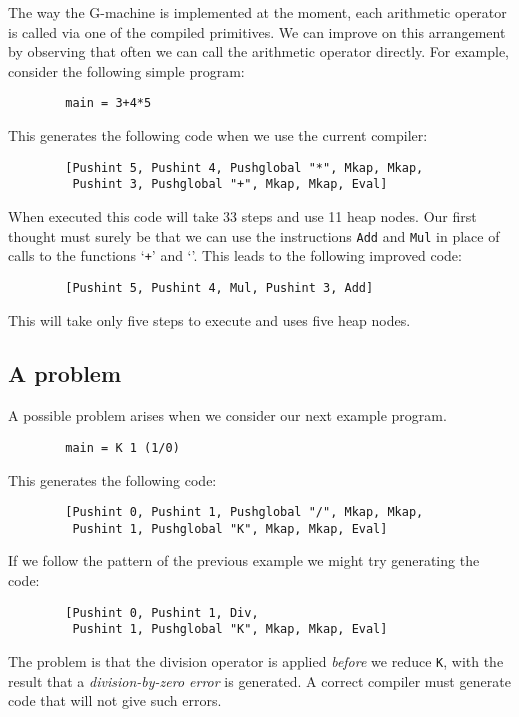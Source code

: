 The way the G-machine is implemented at the moment, each arithmetic
operator is called via one of the compiled primitives. We can
improve on this arrangement by observing that often we can call the
arithmetic operator directly. For example, consider the following
simple program:
\begin{verbatim}
        main = 3+4*5
\end{verbatim}
This generates the following code when we use the current compiler:
\begin{verbatim}
        [Pushint 5, Pushint 4, Pushglobal "*", Mkap, Mkap,
         Pushint 3, Pushglobal "+", Mkap, Mkap, Eval]
\end{verbatim}
When executed this code will take 33 steps and use 11 heap nodes. Our
first thought must surely be that we can use the instructions \mbox{\tt Add}
and \mbox{\tt Mul} in place of calls to the functions `\mbox{\tt +}' and `\mbox{\tt *}'. This
leads to the following improved code:
\begin{verbatim}
        [Pushint 5, Pushint 4, Mul, Pushint 3, Add]
\end{verbatim}
This will take only five steps to execute and uses five heap nodes.

\subsection{A problem}

A possible problem arises when we consider our next example program.
\begin{verbatim}
        main = K 1 (1/0)
\end{verbatim}
This generates the following code:
\begin{verbatim}
        [Pushint 0, Pushint 1, Pushglobal "/", Mkap, Mkap,
         Pushint 1, Pushglobal "K", Mkap, Mkap, Eval]
\end{verbatim}

If we follow the pattern of the previous example we might try
generating the code:
\begin{verbatim}
        [Pushint 0, Pushint 1, Div,
         Pushint 1, Pushglobal "K", Mkap, Mkap, Eval]
\end{verbatim}
The problem is that the division operator is applied {\em before\/} we
reduce \mbox{\tt K}, with the result that a {\em division-by-zero
error\/} is generated.  A correct compiler
must generate code that will not give such errors.

